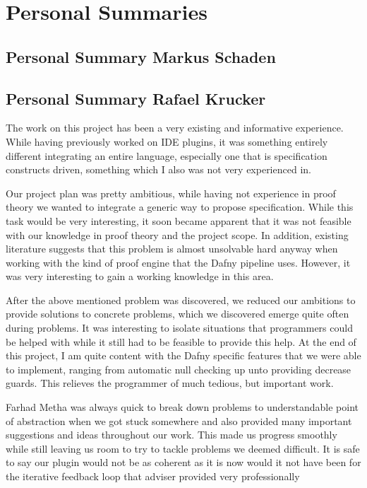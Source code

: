 \section{Personal Summaries}

\subsection{Personal Summary Markus Schaden}

\subsection{Personal Summary Rafael Krucker}
The work on this project has been a very existing and informative experience. While having previously worked on IDE plugins, it was something entirely different integrating an entire language, especially one that is specification constructs driven, something which I also was not very experienced in. \newline

Our project plan was pretty ambitious, while having not experience in proof theory we wanted to integrate a generic way to propose specification. While this task would be very interesting, it soon became apparent that it was not feasible with our knowledge in proof theory and the project scope. In addition, existing literature suggests that this problem is almost unsolvable hard anyway when working with the kind of proof engine that the Dafny pipeline uses. However, it was very interesting to gain a working knowledge in this area. \newline

After the above mentioned problem was discovered, we reduced our ambitions to provide solutions to concrete problems, which we discovered emerge quite often during problems. It was interesting to isolate situations that programmers could be helped with while it still had to be feasible to provide this help. At the end of this project, I am quite content with the Dafny specific features that we were able to implement, ranging from automatic null checking up unto providing decrease guards. This relieves the programmer of much tedious, but important work. \newline

Farhad Metha was always quick to break down problems to understandable point of abstraction when we got stuck somewhere and also provided many important suggestions and ideas throughout our work. This made us progress smoothly while still leaving us room to try to tackle problems we deemed difficult. It is safe to say our plugin would not be as coherent as it is now would it not have been for the iterative feedback loop that adviser provided very professionally \newline

